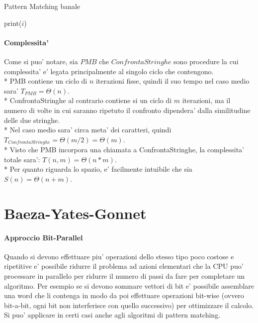 \begin{algorithm}
    \renewcommand\thealgorithm{}
    \caption{Pattern Matching banale}
    \begin{algorithmic}
                    \State print($i$)
                \EndIf
            \EndFor
        \EndProcedure
    \end{algorithmic}
\end{algorithm}

\pagebreak

\paragraph{Complessita'}

Come si puo' notare, sia $PMB$ che $ConfrontaStringhe$ sono procedure la cui complessita' e' legata principalmente al singolo ciclo che contengono. \\*
PMB contiene un ciclo di $n$ iterazioni fisse, quindi il suo tempo nel caso medio sara' $T_{PMB} = \Theta(n)$. \\*
ConfrontaStringhe al contrario contiene si un ciclo di $m$ iterazioni, ma il numero di volte in cui saranno ripetuto il confronto dipendera' dalla similitudine delle due stringhe. \\*
Nel caso medio sara' circa meta' dei caratteri, quindi $T_{ConfrontaStringhe} = \Theta(m / 2) = \Theta(m)$. \\*
Visto che PMB incorpora una chiamata a ConfrontaStringhe, la complessita' totale sara': $T(n, m) = \Theta(n * m)$. \\*
Per quanto riguarda lo spazio, e' facilmente intuibile che sia $S(n) = \Theta(n + m)$.

\section{Baeza-Yates-Gonnet}

\paragraph{Approccio Bit-Parallel}

Quando si devono effettuare piu' operazioni dello stesso tipo poco costose e ripetitive e' possibile ridurre il problema ad azioni elementari che la CPU puo' processare in parallelo per ridurre il numero di passi da fare per completare un algoritmo.
Per esempio se si devono sommare vettori di bit e' possibile assemblare una word che li contenga in modo da poi effettuare operazioni bit-wise (ovvero bit-a-bit, ogni bit non interferisce con quello successivo) per ottimizzare il calcolo.
Si puo' applicare in certi casi anche agli algoritmi di pattern matching.


